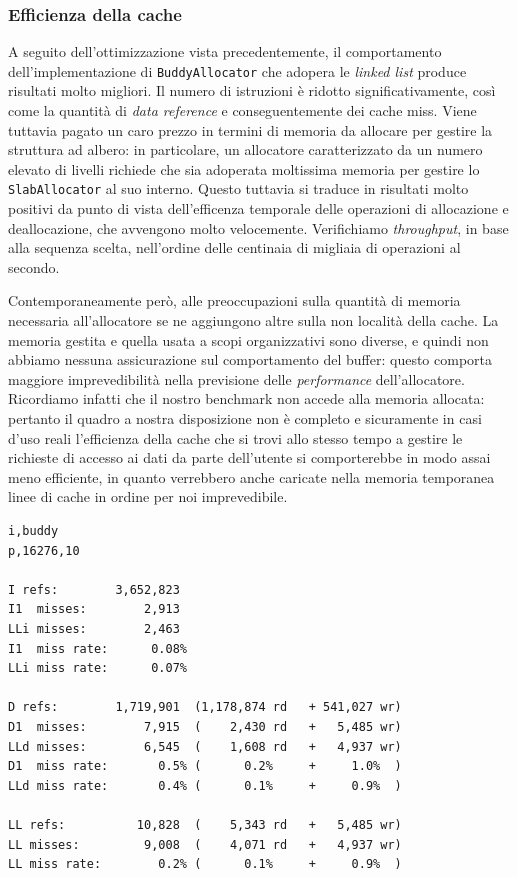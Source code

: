 \subsubsection{Efficienza della cache}

A seguito dell'ottimizzazione vista precedentemente, il comportamento dell'implementazione di \texttt{BuddyAllocator} che adopera le \textit{linked list} produce risultati molto migliori. Il numero di istruzioni è ridotto significativamente, così come la quantità di \textit{data reference} e conseguentemente dei cache miss. Viene tuttavia pagato un caro prezzo in termini di memoria da allocare per gestire la struttura ad albero: in particolare, un allocatore caratterizzato da un numero elevato di livelli richiede che sia adoperata moltissima memoria per gestire lo \texttt{SlabAllocator} al suo interno. Questo tuttavia si traduce in risultati molto positivi da punto di vista dell'efficenza temporale delle operazioni di allocazione e deallocazione, che avvengono molto velocemente. Verifichiamo \textit{throughput}, in base alla sequenza scelta, nell'ordine delle centinaia di migliaia di operazioni al secondo. 

Contemporaneamente però, alle preoccupazioni sulla quantità di memoria necessaria all'allocatore se ne aggiungono altre sulla non località della cache. La memoria gestita e quella usata a scopi organizzativi sono diverse, e quindi non abbiamo nessuna assicurazione sul comportamento del buffer: questo comporta maggiore imprevedibilità nella previsione delle \textit{performance} dell'allocatore. Ricordiamo infatti che il nostro benchmark non accede alla memoria allocata: pertanto il quadro a nostra disposizione non è completo e sicuramente in casi d'uso reali l'efficienza della cache che si trovi allo stesso tempo a gestire le richieste di accesso ai dati da parte dell'utente si comporterebbe in modo assai meno efficiente, in quanto verrebbero anche caricate nella memoria temporanea linee di cache in ordine per noi imprevedibile. 

\begin{lstlisting}[language={}]
i,buddy
p,16276,10

I refs:        3,652,823
I1  misses:        2,913
LLi misses:        2,463
I1  miss rate:      0.08%
LLi miss rate:      0.07%

D refs:        1,719,901  (1,178,874 rd   + 541,027 wr)
D1  misses:        7,915  (    2,430 rd   +   5,485 wr)
LLd misses:        6,545  (    1,608 rd   +   4,937 wr)
D1  miss rate:       0.5% (      0.2%     +     1.0%  )
LLd miss rate:       0.4% (      0.1%     +     0.9%  )

LL refs:          10,828  (    5,343 rd   +   5,485 wr)
LL misses:         9,008  (    4,071 rd   +   4,937 wr)
LL miss rate:        0.2% (      0.1%     +     0.9%  )
\end{lstlisting}

